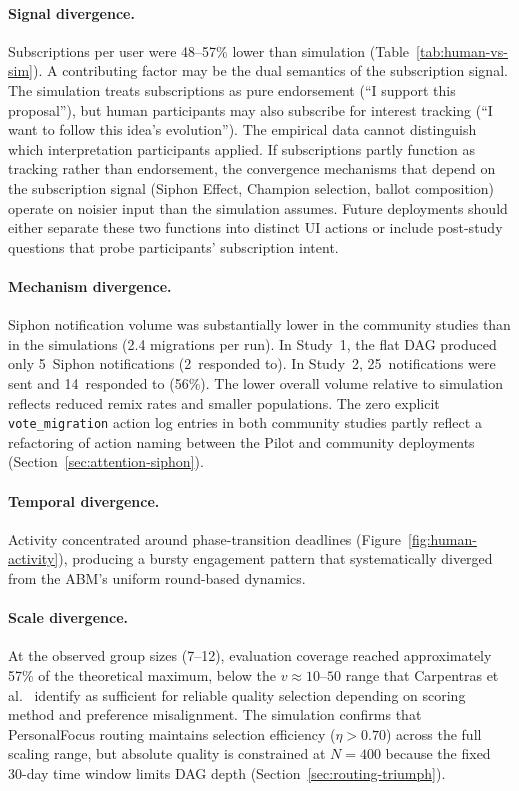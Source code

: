 \documentclass[a4paper, 12pt, twoside]{iviathesis}
\begin{document}
\paragraph{Signal divergence.}
Subscriptions per user were 48--57\% lower than simulation (Table~\ref{tab:human-vs-sim}). A contributing factor may be the dual semantics of the subscription signal. The simulation treats subscriptions as pure endorsement (``I support this proposal''), but human participants may also subscribe for interest tracking (``I want to follow this idea's evolution''). The empirical data cannot distinguish which interpretation participants applied. If subscriptions partly function as tracking rather than endorsement, the convergence mechanisms that depend on the subscription signal (Siphon Effect, Champion selection, ballot composition) operate on noisier input than the simulation assumes. Future deployments should either separate these two functions into distinct UI actions or include post-study questions that probe participants' subscription intent.

\paragraph{Mechanism divergence.}
Siphon notification volume was substantially lower in the community studies than in the simulations (2.4 migrations per run). In Study~1, the flat DAG produced only 5~Siphon notifications (2~responded to). In Study~2, 25~notifications were sent and 14~responded to (56\%). The lower overall volume relative to simulation reflects reduced remix rates and smaller populations. The zero explicit \texttt{vote\_migration} action log entries in both community studies partly reflect a refactoring of action naming between the Pilot and community deployments (Section~\ref{sec:attention-siphon}).

\paragraph{Temporal divergence.}
Activity concentrated around phase-transition deadlines (Figure~\ref{fig:human-activity}), producing a bursty engagement pattern that systematically diverged from the ABM's uniform round-based dynamics.

\paragraph{Scale divergence.}
At the observed group sizes (7--12), evaluation coverage reached approximately 57\% of the theoretical maximum, below the $v \approx 10$--$50$ range that Carpentras et al.\ \cite{carpentras_wisdom_2025} identify as sufficient for reliable quality selection depending on scoring method and preference misalignment. The simulation confirms that PersonalFocus routing maintains selection efficiency ($\eta > 0.70$) across the full scaling range, but absolute quality is constrained at $N=400$ because the fixed 30-day time window limits DAG depth (Section~\ref{sec:routing-triumph}).
\end{document}
